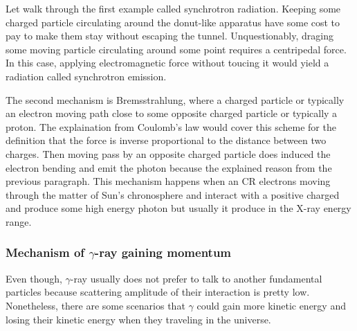 \begin{itemize}
    Let walk through the first example called
    synchrotron radiation. Keeping some charged particle circulating 
    around the donut-like apparatus have some cost to pay to make 
    them stay without escaping the tunnel. Unquestionably, draging
    some moving particle circulating around some point requires a
    centripedal force. In this case, applying electromagnetic force
    without toucing it would yield a radiation called synchrotron emission.

    The second mechanism is Bremsstrahlung, where a charged particle 
    or typically an electron moving path close to some opposite charged 
    particle or typically a proton. The explaination from Coulomb's law
    would cover this scheme for the definition that the force is 
    inverse proportional to the distance between two charges. Then 
    moving pass by an opposite charged particle does induced the electron
    bending and emit the photon because the explained reason from the 
    previous paragraph. This mechanism happens when an CR electrons 
    moving through the matter of Sun's chronosphere and interact with 
    a positive charged and produce some high energy photon but usually 
    it produce in the X-ray energy range.


\end{itemize}



\subsubsection{Mechanism of $\gamma$-ray gaining momentum}

Even though, $\gamma$-ray usually does not prefer
to talk to another fundamental particles because
scattering amplitude of their interaction is pretty 
low. Nonetheless, there are some scenarios that $\gamma$ could 
gain more kinetic energy and losing their kinetic energy 
when they traveling in the universe.


